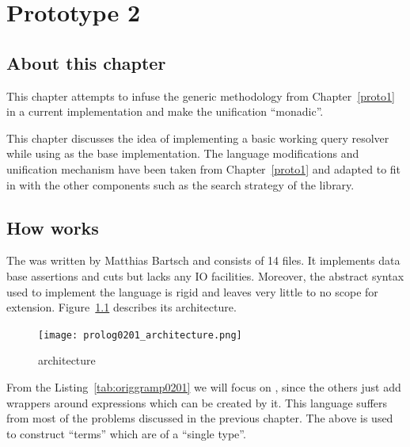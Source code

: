 \documentclass[thesis-solanki.tex]{subfiles}
\begin{document}
\chapter{Prototype 2}{\label{proto2}}

\section{About this chapter}
This chapter attempts to infuse the generic methodology from Chapter~\ref{proto1} in a current 
implementation \cite{prolog-lib} and make the unification ``monadic''.

This chapter discusses the idea of implementing a basic working  query resolver while using 
\cite{prolog-lib} as the base implementation.
The language modifications and unification mechanism have been taken from Chapter~\ref{proto1} and adapted to fit
in with the other components such as the search strategy of the library.


\section{How \protect{} works}

The  \cite{prolog-lib} was written by Matthias Bartsch and consists of 14  files. It 
implements data base assertions and cuts but lacks any IO facilities. Moreover, the abstract syntax used to implement the language is rigid
and leaves very little to no scope for extension. Figure~\ref{fig:prlg0201architecture} describes its architecture.

\begin{figure}[H]
\centering
\texttt{[image: prolog0201\_architecture.png]}
\caption{ \cite{prolog-lib} architecture}
\label{fig:prlg0201architecture}
\end{figure}

From the Listing~\ref{tab:origgramp0201} we will focus on , since the others just
add wrappers around expressions which can be created by it.
This language suffers from most of the problems discussed in the previous chapter.
The above is used to construct  ``terms'' which are of a ``single type''.
\end{document}
